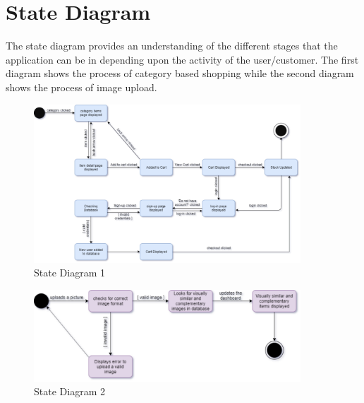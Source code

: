 \section{State Diagram}
The state diagram provides an understanding of the different stages that the application can be in depending upon the activity of the user/customer. The first diagram shows the process of category based shopping while the second diagram shows the process of image upload.
\begin{figure}[H]
\includegraphics[width=10cm]{images/StateDiag1.pdf} 
\centering
\caption{State Diagram 1}
\label{state: one}
\end{figure}

\begin{figure}[H]
\includegraphics[width=10cm]{images/StateDiag2.pdf} 
\centering
\caption{State Diagram 2}
\label{state: two}
\end{figure}

